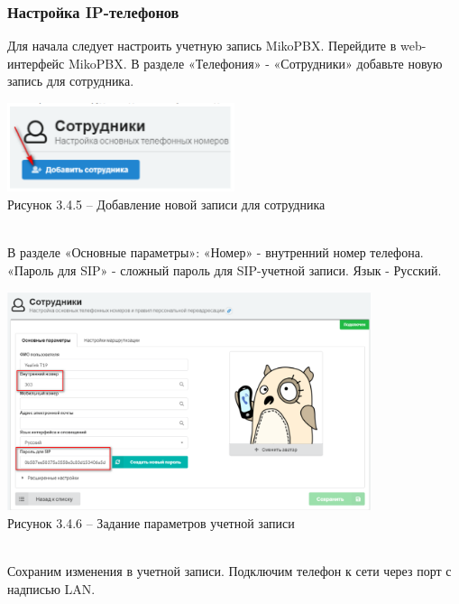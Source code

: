     \subsubsection{Настройка IP-телефонов}
    Для начала следует настроить учетную запись MikoPBX.
    Перейдите в web-интерфейс MikoPBX.
    В разделе «Телефония» - «Сотрудники» добавьте новую запись для сотрудника.
    \\
    \begin{center}
        \includegraphics[width=0.5\textwidth]{images/users1}\\
        Рисунок 3.4.5 – Добавление новой записи для сотрудника
    \end{center}
    \\
    В разделе «Основные параметры»:
    «Номер» - внутренний номер телефона.
    «Пароль для SIP» - сложный пароль для SIP-учетной записи.
    Язык - Русский.
    \\
    \begin{center}
        \includegraphics[width=0.8\textwidth]{images/main_config}\\
        Рисунок 3.4.6 – Задание параметров учетной записи
    \end{center}
    \\
    Сохраним изменения в учетной записи.
    Подключим телефон к сети через порт с надписью LAN.
    \\

